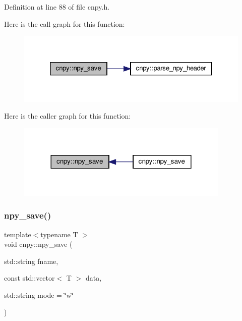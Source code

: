 Definition at line 88 of file cnpy.\+h.

Here is the call graph for this function\+:
\nopagebreak
\begin{figure}[H]
\begin{center}
\leavevmode
\includegraphics[width=325pt]{namespacecnpy_abd95249bf67216d36416294df339fb47_cgraph}
\end{center}
\end{figure}
Here is the caller graph for this function\+:
\nopagebreak
\begin{figure}[H]
\begin{center}
\leavevmode
\includegraphics[width=288pt]{namespacecnpy_abd95249bf67216d36416294df339fb47_icgraph}
\end{center}
\end{figure}
\mbox{\label{namespacecnpy_a9311beeca7e441c777c78fc80be40649}} 
\subsubsection{\texorpdfstring{npy\+\_\+save()}{npy\_save()}\hspace{0.1cm}{\footnotesize\ttfamily [2/2]}}
{\footnotesize\ttfamily template$<$typename T $>$ \\
void cnpy\+::npy\+\_\+save (\begin{DoxyParamCaption}\item[{std\+::string}]{fname,  }\item[{const std\+::vector$<$ T $>$}]{data,  }\item[{std\+::string}]{mode = {\ttfamily \char`\"{}w\char`\"{}} }\end{DoxyParamCaption})}



